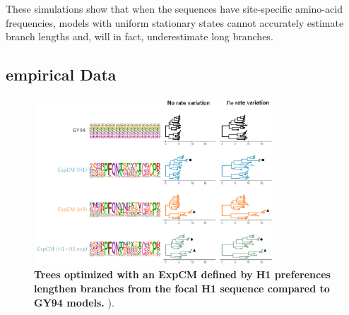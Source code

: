 \documentclass[11pt]{article}
\begin{document}
These simulations show that when the sequences have site-specific amino-acid frequencies, models with uniform stationary states cannot accurately estimate branch lengths and, will in fact, underestimate long branches. 	

\subsection*{empirical Data}

\begin{figure}[H]
\centerline{\includegraphics[width=0.8\textwidth]{figures/empirical_trees.pdf}}
\caption{\label{fig:empirical_trees}
\textbf{Trees optimized with an ExpCM defined by H1 preferences lengthen branches from the focal H1 sequence compared to GY94 models.} ).
}
\end{figure}
\end{document}
